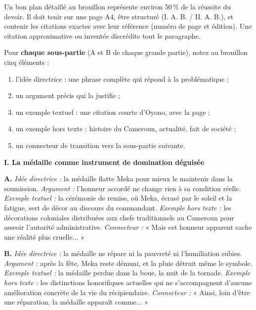 \documentclass[11pt]{article}
\newcommand{\cle}[1]{{\popxbold\color{popdark}#1}}
\begin{document}
\begin{propriete}
Un bon \cle{plan détaillé} au brouillon représente environ 50\,\% de la réussite du devoir. Il doit tenir sur une page A4, être structuré (I. A. B. / II. A. B.), et contenir les citations exactes avec leur référence (numéro de page et édition). Une citation approximative ou inventée discrédite tout le paragraphe.
\end{propriete}

Pour \textbf{chaque sous-partie} (A et B de chaque grande partie), notez au brouillon cinq éléments :
\begin{enumerate}
\item l'\cle{idée directrice} : une phrase complète qui répond à la problématique ;
\item un \cle{argument} précis qui la justifie ;
\item un \cle{exemple textuel} : une citation courte d'Oyono, avec la page ;
\item un \cle{exemple hors texte} : histoire du Cameroun, actualité, fait de société ;
\item un \cle{connecteur de transition} vers la sous-partie suivante.
\end{enumerate}

\begin{exemplebox}
\textbf{I. La médaille comme instrument de domination déguisée}\par
\textbf{A.} \emph{Idée directrice :} la médaille flatte Meka pour mieux le maintenir dans la soumission. \emph{Argument :} l'honneur accordé ne change rien à sa condition réelle. \emph{Exemple textuel :} la cérémonie de remise, où Meka, écrasé par le soleil et la fatigue, sert de décor au discours du commandant. \emph{Exemple hors texte :} les décorations coloniales distribuées aux chefs traditionnels au Cameroun pour asseoir l'autorité administrative. \emph{Connecteur :} « Mais cet honneur apparent cache une réalité plus cruelle... »\par
\textbf{B.} \emph{Idée directrice :} la médaille ne répare ni la pauvreté ni l'humiliation subies. \emph{Argument :} après la fête, Meka reste démuni, et la pluie détruit même le symbole. \emph{Exemple textuel :} la médaille perdue dans la boue, la nuit de la tornade. \emph{Exemple hors texte :} les distinctions honorifiques actuelles qui ne s'accompagnent d'aucune amélioration concrète de la vie du récipiendaire. \emph{Connecteur :} « Ainsi, loin d'être une réparation, la médaille apparaît comme... »
\end{exemplebox}
\end{document}

